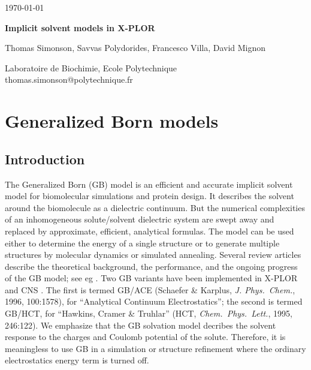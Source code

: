 \documentclass[12pt]{report}
\begin{document}
%


\hfill \today

\vspace*{3cm}

\Large
\begin{center}
{\bf Implicit solvent models in X-PLOR}
\end{center}

\vskip 1cm

\large

\centerline{Thomas Simonson, Savvas Polydorides, Francesco Villa, David Mignon}
  \vskip 0.7cm

\begin{center}
Laboratoire de Biochimie, Ecole Polytechnique \\
\normalsize
thomas.simonson@polytechnique.fr
\end{center}

\vskip 2cm
\normalsize

\pagebreak
\pagestyle{headings}
\chapter{Generalized Born models}
\section{Introduction}
The Generalized Born (GB) model \cite{Still90,Hawkins95,Schaefer96,Qiu97} is an
efficient and accurate implicit solvent model for biomolecular simulations and
protein design. It describes the solvent around the biomolecule as a dielectric
continuum. But the numerical complexities of an inhomogeneous solute/solvent dielectric
system are swept away and replaced by approximate, efficient, analytical formulas.
The model can be used either to determine the energy of a single structure or
to generate multiple structures by molecular dynamics or simulated annealing. Several
review articles describe the theoretical background, the performance, and the ongoing
progress of the GB model; see eg \cite{Bashford00,Roux99,Simonson03}. Two GB variants have
been implemented in X-PLOR \cite{Xplor} and CNS \cite{CNS}. The first is termed GB/ACE
(Schaefer \& Karplus, {\it J. Phys.\ Chem.}, 1996, 100:1578), for ``Analytical Continuum
Electrostatics''; the second is termed GB/HCT, for ``Hawkins, Cramer \& Truhlar'' (HCT,
{\it Chem.\ Phys.\ Lett.}, 1995, 246:122). We emphasize that the GB solvation model decribes
the solvent response to the charges and Coulomb potential of the solute. Therefore, it
is meaningless to use GB in a simulation or structure refinement where the ordinary
electrostatics energy term is turned off.  
\end{document}
